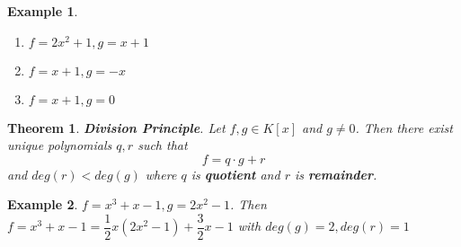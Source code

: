 \documentclass[a4paper,10pt]{article}
\newtheorem{theo}{Theorem}
\newtheorem{ex}{Example}
\begin{document}
\begin{ex}
	\begin{enumerate}
		\item $ f=2x^2 +1 , g =x+1 $
		\item  $ f=x+1, g=-x $
		\item  $ f=x+1, g =0 $
	\end{enumerate}
\end{ex}

\begin{theo}
	\textbf{Division Principle}. Let $ f,g \in K[x] $ and $ g \neq 0 $. Then there exist unique polynomials $ q,r $ such that
	\[ f= q \cdot g + r  \] and $ deg(r) < deg(g) $ where $ q $ is \textbf{quotient} and $ r $ is \textbf{remainder}.
\end{theo}

\begin{ex}
	$ f = x^3 +x -1 , g =2x^2 -1 $. Then $ f = x^3+x-1 = \dfrac{1}{2} x (2x^2-1) + \dfrac{3}{2}x -1 $ with $ deg(g)=2 , deg(r)=1 $
\end{ex}
\end{document}
